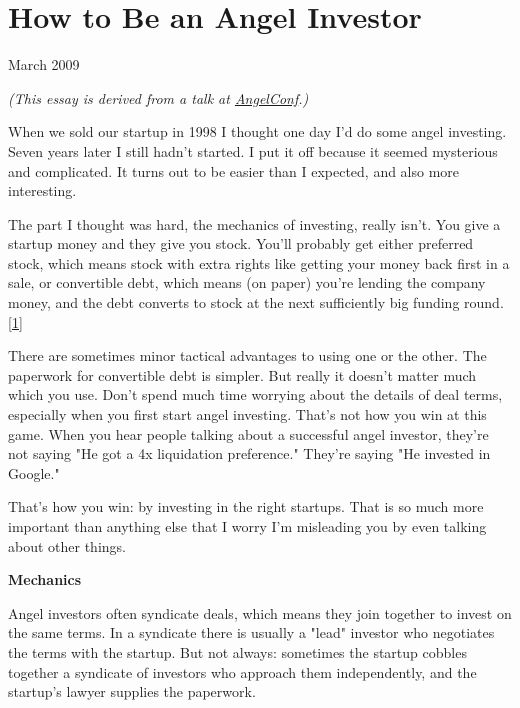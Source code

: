 \chapter{How to Be an Angel Investor}


            
              
                

March 2009

\emph{(This essay is derived from a talk at
                    \href{http://angelconf.org}{AngelConf}.)}

When we sold our startup in 1998 I thought one
                  day I'd do some angel investing. Seven years later I still
                  hadn't started. I put it off because it seemed mysterious and
                  complicated. It turns out to be easier than I expected, and
                  also more interesting.

The part I thought was hard,
                  the mechanics of investing, really isn't. You give a startup
                  money and they give you stock. You'll probably get either
                  preferred stock, which means stock with extra rights like
                  getting your money back first in a sale, or convertible debt,
                  which means (on paper) you're lending the company money, and
                  the debt converts to stock at the next sufficiently big
                  funding round.
                  [\href{\#f1n}{1}]

There are sometimes minor tactical advantages to
                  using one or the other. The paperwork for convertible debt is
                  simpler. But really it doesn't matter much which you use.
                  Don't spend much time worrying about the details of deal
                  terms, especially when you first start angel investing. That's
                  not how you win at this game. When you hear people talking
                  about a successful angel investor, they're not saying "He got
                  a 4x liquidation preference." They're saying "He invested in
                  Google."

That's how you win: by investing in the
                  right startups. That is so much more important than anything
                  else that I worry I'm misleading you by even talking about
                  other things.

\textbf{Mechanics}

Angel
                  investors often syndicate deals, which means they join
                  together to invest on the same terms. In a syndicate there is
                  usually a "lead" investor who negotiates the terms with the
                  startup. But not always: sometimes the startup cobbles
                  together a syndicate of investors who approach them
                  independently, and the startup's lawyer supplies the
                  paperwork.

